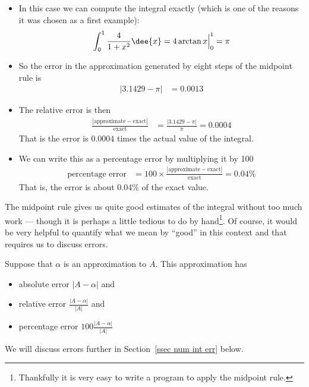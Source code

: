 \begin{eg}
\begin{itemize}
\item In this case we can compute the integral exactly (which is one of the reasons it
was chosen as a first example):
\begin{align*}
\int_0^1\frac{4}{1+x^2}\dee{x} =4\arctan x\Big|_0^1 = \pi
\end{align*}

\item So the error in the approximation generated by eight steps of the midpoint
rule is
\begin{align*}
|3.1429-\pi| &=0.0013
\end{align*}
\item The relative error is then
\begin{align*}
  \frac{|\text{approximate}-\text{exact}|}{\text{exact}}
  &= \frac{|3.1429-\pi|}{\pi}=0.0004
\end{align*}
That is the error is $0.0004$ times the actual value of the integral.
\item We can write this as a percentage error by multiplying it by 100
\begin{align*}
  \text{percentage error} &= 100 \times
\frac{|\text{approximate}-\text{exact}|}{\text{exact}}
  = 0.04 \%
\end{align*}
That is, the error is about 0.04\% of the exact value.
\end{itemize}

\end{eg}
The midpoint rule gives us quite good estimates of the integral without too much work
--- though it is perhaps a little tedious to do by hand\footnote{Thankfully it is very
easy to write a program to apply the midpoint rule.}. Of course, it would be very helpful
to quantify what we mean by ``good'' in this context and that requires us to discuss
errors.
\begin{defn}\label{def:errorType}
Suppose that $\alpha$ is an approximation to $A$. This approximation
has
\begin{itemize}
\item absolute error $|A-\alpha|$ and
\item relative error $\frac{|A-\alpha|}{|A|}$ and
\item percentage error $100\frac{|A-\alpha|}{|A|}$
\end{itemize}
\end{defn}
We will discuss errors further in Section~\ref{ssec num int err} below.

